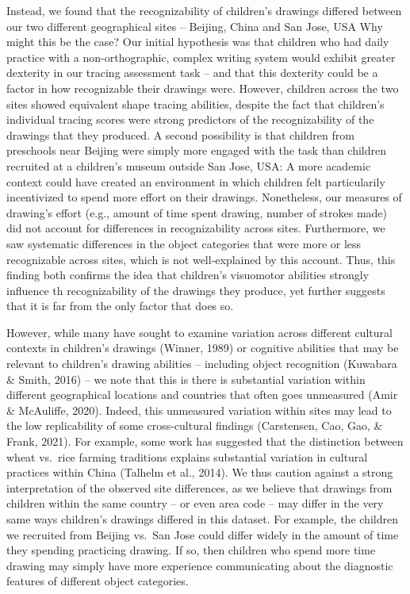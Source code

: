 \documentclass[
  english,
  man]{apa6}
\begin{document}
Instead, we found that the recognizability of children's drawings differed between our two different geographical sites -- Beijing, China and San Jose, USA Why might this be the case? Our initial hypothesis was that children who had daily practice with a non-orthographic, complex writing system would exhibit greater dexterity in our tracing assessment task -- and that this dexterity could be a factor in how recognizable their drawings were. However, children across the two sites showed equivalent shape tracing abilities, despite the fact that children's individual tracing scores were strong predictors of the recognizability of the drawings that they produced. A second possibility is that children from preschools near Beijing were simply more engaged with the task than children recruited at a children's museum outside San Jose, USA: A more academic context could have created an environment in which children felt particularily incentivized to spend more effort on their drawings. Nonetheless, our measures of drawing's effort (e.g., amount of time spent drawing, number of strokes made) did not account for differences in recognizability across sites. Furthermore, we saw systematic differences in the object categories that were more or less recognizable across sites, which is not well-explained by this account. Thus, this finding both confirms the idea that children's visuomotor abilities strongly influence th recognizability of the drawings they produce, yet further suggests that it is far from the only factor that does so.

However, while many have sought to examine variation across different cultural contexts in children's drawings (Winner, 1989) or cognitive abilities that may be relevant to children's drawing abilities -- including object recognition (Kuwabara \& Smith, 2016) -- we note that this is there is substantial variation within different geographical locations and countries that often goes unmeasured (Amir \& McAuliffe, 2020). Indeed, this unmeasured variation within sites may lead to the low replicability of some cross-cultural findings (Carstensen, Cao, Gao, \& Frank, 2021). For example, some work has suggested that the distinction between wheat vs.~rice farming traditions explains substantial variation in cultural practices within China (Talhelm et al., 2014). We thus caution against a strong interpretation of the observed site differences, as we believe that drawings from children within the same country -- or even area code -- may differ in the very same ways children's drawings differed in this dataset. For example, the children we recruited from Beijing vs.~San Jose could differ widely in the amount of time they spending practicing drawing. If so, then children who spend more time drawing may simply have more experience communicating about the diagnostic features of different object categories.
\end{document}
